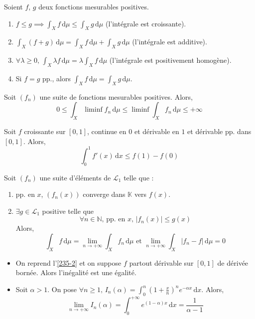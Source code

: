 	\begin{application}
		Soient $f$, $g$ deux fonctions mesurables positives.
		\begin{enumerate}[label=(\roman*)]
			\item $f \leq g \implies \int_X f \, \mathrm{d}\mu \leq \int_X g \, \mathrm{d}\mu$ (l'intégrale est croissante).
			\item $\int_X (f+g) \, \mathrm{d}\mu = \int_X f \, \mathrm{d}\mu + \int_X g \, \mathrm{d}\mu$ (l'intégrale est additive).
			\item $\forall \lambda \geq 0, \, \int_X \lambda f \, \mathrm{d}\mu = \lambda \int_X f \, \mathrm{d}\mu$ (l'intégrale est positivement homogène).
			\item Si $f = g$ pp., alors $\int_X f \, \mathrm{d}\mu = \int_X g \, \mathrm{d}\mu$.
		\end{enumerate}
	\end{application}
	
	
	\begin{theorem}
		Soit $(f_n)$ une suite de fonctions mesurables positives. Alors,
		\[ 0 \leq \int_X \liminf f_n \, \mathrm{d}\mu \leq \liminf \int_X f_n \, \mathrm{d}\mu \leq +\infty \]
	\end{theorem}
	
	\begin{example}
		\label{235-2}
		Soit $f$ croissante sur $[0,1]$, continue en $0$ et dérivable en $1$ et dérivable pp. dans $[0,1]$. Alors,
		\[ \int_{0}^{1} f'(x) \, \mathrm{d}x \leq f(1) - f(0) \]
	\end{example}
	
	\begin{theorem}
		Soit $(f_n)$ une suite d'éléments de $\mathcal{L}_1$ telle que :
		\begin{enumerate}[label=(\roman*)]
			\item pp. en $x$, $(f_n(x))$ converge dans $\mathbb{K}$ vers $f(x)$.
			\item $\exists g \in \mathcal{L}_1$ positive telle que
			\[ \forall n \in \mathbb{N}, \, \text{pp. en } x, \, \vert f_n(x) \vert \leq g(x) \]
			Alors,
			\[ \int_X f \, \mathrm{d}\mu = \lim_{n \rightarrow +\infty} \int_X f_n \, \mathrm{d}\mu \text{ et } \lim_{n \rightarrow +\infty} \int_X \vert f_n - f \vert \, \mathrm{d}\mu = 0 \]
		\end{enumerate}
	\end{theorem}
	
	\begin{example}
		\begin{itemize}
			\item On reprend l'\cref{235-2} et on suppose $f$ partout dérivable sur $[0,1]$ de dérivée bornée. Alors l'inégalité est une égalité.
			\item Soit $\alpha > 1$. On pose $\forall n \geq 1, \, I_n(\alpha) = \int_0^n \left( 1 + \frac{x}{n} \right)^n e^{-\alpha x} \, \mathrm{d}x$. Alors,
			\[ \lim_{n \rightarrow +\infty} I_n(\alpha) = \int_0^{+\infty} e^{(1-\alpha)x} \, \mathrm{d}x = \frac{1}{\alpha - 1} \]
		\end{itemize}
	\end{example}
	
